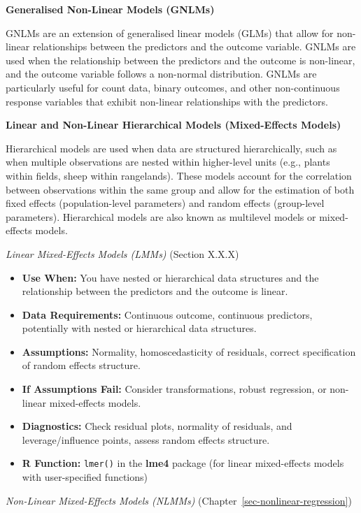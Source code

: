 \documentclass[
  letterpaper,
]{book}
\providecommand{\tightlist}{%
  \setlength{\itemsep}{0pt}\setlength{\parskip}{0pt}}\usepackage{longtable,booktabs,array}
\begin{document}
\textbf{Generalised Non-Linear Models (GNLMs)}

GNLMs are an extension of generalised linear models (GLMs) that allow
for non-linear relationships between the predictors and the outcome
variable. GNLMs are used when the relationship between the predictors
and the outcome is non-linear, and the outcome variable follows a
non-normal distribution. GNLMs are particularly useful for count data,
binary outcomes, and other non-continuous response variables that
exhibit non-linear relationships with the predictors.

\textbf{Linear and Non-Linear Hierarchical Models (Mixed-Effects
Models)}

Hierarchical models are used when data are structured hierarchically,
such as when multiple observations are nested within higher-level units
(e.g., plants within fields, sheep within rangelands). These models
account for the correlation between observations within the same group
and allow for the estimation of both fixed effects (population-level
parameters) and random effects (group-level parameters). Hierarchical
models are also known as multilevel models or mixed-effects models.

\emph{Linear Mixed-Effects Models (LMMs)} (Section X.X.X)

\begin{itemize}
\tightlist
\item
  \textbf{Use When:} You have nested or hierarchical data structures and
  the relationship between the predictors and the outcome is linear.
\item
  \textbf{Data Requirements:} Continuous outcome, continuous predictors,
  potentially with nested or hierarchical data structures.
\item
  \textbf{Assumptions:} Normality, homoscedasticity of residuals,
  correct specification of random effects structure.
\item
  \textbf{If Assumptions Fail:} Consider transformations, robust
  regression, or non-linear mixed-effects models.
\item
  \textbf{Diagnostics:} Check residual plots, normality of residuals,
  and leverage/influence points, assess random effects structure.
\item
  \textbf{R Function:} \texttt{lmer()} in the \textbf{lme4} package (for
  linear mixed-effects models with user-specified functions)
\end{itemize}

\emph{Non-Linear Mixed-Effects Models (NLMMs)}
(Chapter~\ref{sec-nonlinear-regression})
\end{document}
